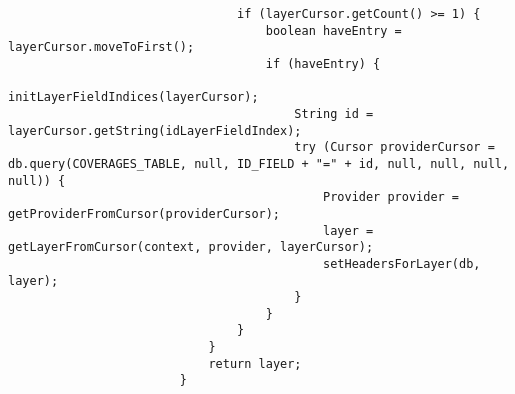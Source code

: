 \begin{enumerate}
\begin{itemize}
\begin{verbatim}
                                if (layerCursor.getCount() >= 1) {
                                    boolean haveEntry = layerCursor.moveToFirst();
                                    if (haveEntry) {
                                        initLayerFieldIndices(layerCursor);
                                        String id = layerCursor.getString(idLayerFieldIndex);
                                        try (Cursor providerCursor = db.query(COVERAGES_TABLE, null, ID_FIELD + "=" + id, null, null, null, null)) {
                                            Provider provider = getProviderFromCursor(providerCursor);
                                            layer = getLayerFromCursor(context, provider, layerCursor);
                                            setHeadersForLayer(db, layer);
                                        }
                                    }
                                }
                            }
                            return layer;
                        }
                    \end{verbatim}
          \end{itemize}


\end{enumerate}
